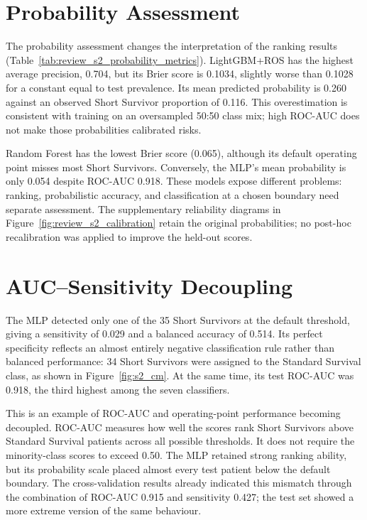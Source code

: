\section{Probability Assessment}
\label{sec:s2r_calibration}

The probability assessment changes the interpretation of the ranking results (Table~\ref{tab:review_s2_probability_metrics}). LightGBM+ROS has the highest average precision, 0.704, but its Brier score is 0.1034, slightly worse than 0.1028 for a constant equal to test prevalence. Its mean predicted probability is 0.260 against an observed Short Survivor proportion of 0.116. This overestimation is consistent with training on an oversampled 50:50 class mix; high ROC-AUC does not make those probabilities calibrated risks.

Random Forest has the lowest Brier score (0.065), although its default operating point misses most Short Survivors. Conversely, the MLP's mean probability is only 0.054 despite ROC-AUC 0.918. These models expose different problems: ranking, probabilistic accuracy, and classification at a chosen boundary need separate assessment. The supplementary reliability diagrams in Figure~\ref{fig:review_s2_calibration} retain the original probabilities; no post-hoc recalibration was applied to improve the held-out scores.

\section{AUC--Sensitivity Decoupling}
\label{sec:s2r_decoupling}

The MLP detected only one of the 35 Short Survivors at the default threshold, giving a sensitivity of 0.029 and a balanced accuracy of 0.514. Its perfect specificity reflects an almost entirely negative classification rule rather than balanced performance: 34 Short Survivors were assigned to the Standard Survival class, as shown in Figure~\ref{fig:s2_cm}. At the same time, its test ROC-AUC was 0.918, the third highest among the seven classifiers.

This is an example of ROC-AUC and operating-point performance becoming decoupled. ROC-AUC measures how well the scores rank Short Survivors above Standard Survival patients across all possible thresholds. It does not require the minority-class scores to exceed 0.50. The MLP retained strong ranking ability, but its probability scale placed almost every test patient below the default boundary. The cross-validation results already indicated this mismatch through the combination of ROC-AUC 0.915 and sensitivity 0.427; the test set showed a more extreme version of the same behaviour.

